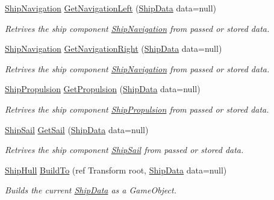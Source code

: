 \begin{DoxyCompactItemize}
\hyperlink{class_skyrates_1_1_client_1_1_ship_1_1_ship_navigation}{Ship\-Navigation} \hyperlink{class_skyrates_1_1_client_1_1_ship_1_1_ship_builder_a34895f96ee52dcb26c94b58fc8c4acbc}{Get\-Navigation\-Left} (\hyperlink{class_ship_data}{Ship\-Data} data=null)
\begin{DoxyCompactList}\small\item\em Retrives the ship component \hyperlink{class_skyrates_1_1_client_1_1_ship_1_1_ship_navigation}{Ship\-Navigation} from passed or stored data. \end{DoxyCompactList}\item 
\hyperlink{class_skyrates_1_1_client_1_1_ship_1_1_ship_navigation}{Ship\-Navigation} \hyperlink{class_skyrates_1_1_client_1_1_ship_1_1_ship_builder_a4eb866fb928986aef1643a1d1ba736c3}{Get\-Navigation\-Right} (\hyperlink{class_ship_data}{Ship\-Data} data=null)
\begin{DoxyCompactList}\small\item\em Retrives the ship component \hyperlink{class_skyrates_1_1_client_1_1_ship_1_1_ship_navigation}{Ship\-Navigation} from passed or stored data. \end{DoxyCompactList}\item 
\hyperlink{class_skyrates_1_1_client_1_1_ship_1_1_ship_propulsion}{Ship\-Propulsion} \hyperlink{class_skyrates_1_1_client_1_1_ship_1_1_ship_builder_ac92e1e3ad5755dca444b6d18d93c9a42}{Get\-Propulsion} (\hyperlink{class_ship_data}{Ship\-Data} data=null)
\begin{DoxyCompactList}\small\item\em Retrives the ship component \hyperlink{class_skyrates_1_1_client_1_1_ship_1_1_ship_propulsion}{Ship\-Propulsion} from passed or stored data. \end{DoxyCompactList}\item 
\hyperlink{class_skyrates_1_1_client_1_1_ship_1_1_ship_sail}{Ship\-Sail} \hyperlink{class_skyrates_1_1_client_1_1_ship_1_1_ship_builder_a44d9c44d336bb602efe3fd68d5ed81c6}{Get\-Sail} (\hyperlink{class_ship_data}{Ship\-Data} data=null)
\begin{DoxyCompactList}\small\item\em Retrives the ship component \hyperlink{class_skyrates_1_1_client_1_1_ship_1_1_ship_sail}{Ship\-Sail} from passed or stored data. \end{DoxyCompactList}\item 
\hyperlink{class_skyrates_1_1_client_1_1_ship_1_1_ship_hull}{Ship\-Hull} \hyperlink{class_skyrates_1_1_client_1_1_ship_1_1_ship_builder_a0044eec6a8d989095a6842b6461d7753}{Build\-To} (ref Transform root, \hyperlink{class_ship_data}{Ship\-Data} data=null)
\begin{DoxyCompactList}\small\item\em Builds the current \hyperlink{class_ship_data}{Ship\-Data} as a Game\-Object. \end{DoxyCompactList}\end{DoxyCompactItemize}
